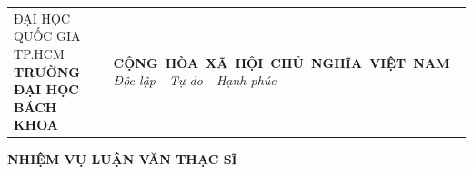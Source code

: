 

\thispagestyle{empty}

\noindent
\begin{tabular}{@{}p{}p{}@{}}
\fontsize{12}{14}\selectfont
ĐẠI HỌC QUỐC GIA TP.HCM\newline
\textbf{TRƯỜNG ĐẠI HỌC BÁCH KHOA}
&
\fontsize{12}{14}\selectfont
\centering
\mbox{\textbf{CỘNG HÒA XÃ HỘI CHỦ NGHĨA VIỆT NAM}}\newline
\vspace{0.4cm}
\textit{Độc lập - Tự do - Hạnh phúc}
\end{tabular}

\vspace{1cm}

\begin{center}
{\fontsize{16}{19}\selectfont\bfseries
NHIỆM VỤ LUẬN VĂN THẠC SĨ\\
}
\end{center}

\vspace{0.5cm}

